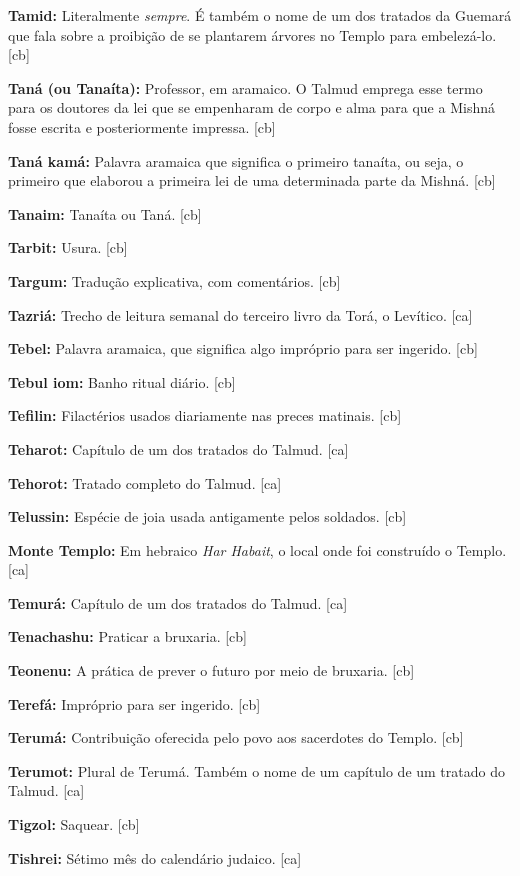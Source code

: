 \textbf{Tamid:} Literalmente \emph{sempre}. É também o nome de um dos tratados 
da Guemará que fala sobre a proibição de se plantarem árvores no Templo para
embelezá-lo. [cb]

\textbf{Taná (ou Tanaíta):} Professor, em aramaico. O Talmud emprega 
esse termo para os doutores da lei que se
empenharam de corpo e alma para que a Mishná fosse escrita e
posteriormente impressa. [cb]

\textbf{Taná kamá:} Palavra aramaica que significa o primeiro tanaíta,
ou seja, o primeiro que elaborou a primeira lei de uma determinada
parte da Mishná. [cb]

\textbf{Tanaim:} Tanaíta ou Taná. [cb]

\textbf{Tarbit:} Usura. [cb]

\textbf{Targum:} Tradução explicativa, com comentários. [cb]

\textbf{Tazriá:} Trecho de leitura semanal do terceiro livro da Torá, o Levítico. [ca]

\textbf{Tebel:} Palavra aramaica, que significa algo
impróprio para ser ingerido. [cb]

\textbf{Tebul iom:} Banho ritual diário. [cb]

\textbf{Tefilin:} Filactérios usados diariamente nas preces matinais. [cb]

\textbf{Teharot:} Capítulo de um dos tratados do Talmud. [ca]

\textbf{Tehorot:} Tratado completo do Talmud. [ca]

\textbf{Telussin:} Espécie de joia usada antigamente pelos soldados. [cb]

\textbf{Monte Templo:} Em hebraico \emph{Har Habait}, 
o local onde foi construído o Templo. [ca]

\textbf{Temurá:} Capítulo de um dos tratados do Talmud. [ca]

\textbf{Tenachashu:} Praticar a bruxaria. [cb]

\textbf{Teonenu:} A prática de prever o futuro por meio de bruxaria. [cb]

\textbf{Terefá:} Impróprio para ser ingerido. [cb]

\textbf{Terumá:} Contribuição oferecida pelo povo aos sacerdotes do Templo. [cb]

\textbf{Terumot:} Plural de Terumá. Também o nome de um capítulo 
de um tratado do Talmud. [ca]

\textbf{Tigzol:} Saquear. [cb]

\textbf{Tishrei:} Sétimo mês do calendário judaico. [ca]

